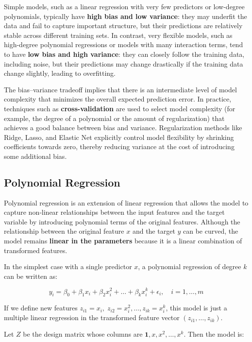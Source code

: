Simple models, such as a linear regression with very few predictors or low-degree polynomials, typically have \textbf{high bias and low variance}: they may underfit the data and fail to capture important structure, but their predictions are relatively stable across different training sets. In contrast, very flexible models, such as high-degree polynomial regressions or models with many interaction terms, tend to have \textbf{low bias and high variance}: they can closely follow the training data, including noise, but their predictions may change drastically if the training data change slightly, leading to overfitting. 

The bias–variance tradeoff implies that there is an intermediate level of model complexity that minimizes the overall expected prediction error. In practice, techniques such as \textbf{cross-validation} are used to select model complexity (for example, the degree of a polynomial or the amount of regularization) that achieves a good balance between bias and variance. Regularization methods like Ridge, Lasso, and Elastic Net explicitly control model flexibility by shrinking coefficients towards zero, thereby reducing variance at the cost of introducing some additional bias.


\subsection{Polynomial Regression}

Polynomial regression is an extension of linear regression that allows the model to capture non‑linear relationships between the input features and the target variable by introducing polynomial terms of the original features. Although the relationship between the original feature $x$ and the target $y$ can be curved, the model remains \textbf{linear in the parameters} because it is a linear combination of transformed features.


In the simplest case with a single predictor $x$, a polynomial regression of degree $k$ can be written as:

\[
y_i = \beta_0 + \beta_1 x_i + \beta_2 x_i^2 + \dots + \beta_k x_i^k + \epsilon_i,
\quad i = 1, \dots, m
\]

If we define new features $z_{i1} = x_i, \; z_{i2} = x_i^2, \dots, z_{ik} = x_i^k$, this model is just a multiple linear regression in the transformed feature vector $(z_{i1}, \dots, z_{ik})$.

Let $Z$ be the design matrix whose columns are $\mathbf{1}, x, x^2, \dots, x^k$. Then the model is:

